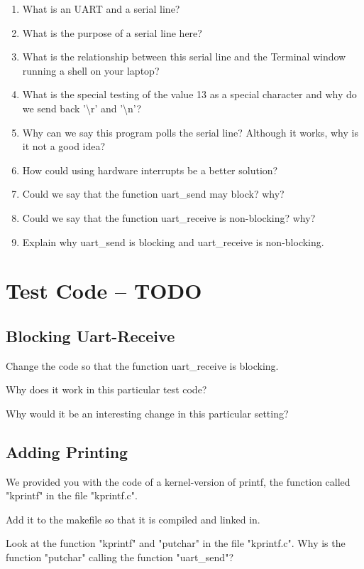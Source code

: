\documentclass[10]{article}
\begin{document}
\begin{enumerate}
\item
  What is an UART and a serial line? 
\item
  What is the purpose of a serial line here?
\item
  What is the relationship between this serial line
  and the Terminal window running a shell on your laptop?
\item
  What is the special testing of the value 13 as a special
  character and why do we send back '\textbackslash r' and '\textbackslash n'?
\item
  Why can we say this program polls the serial line?
  Although it works, why is it not a good idea?
\item
  How could using hardware interrupts be a better solution?
\item
  Could we say that the function uart\_send may block? why?
\item
  Could we say that the function uart\_receive is non-blocking? why?
\item
  Explain why uart\_send is blocking and uart\_receive is non-blocking.  
\end{enumerate}

\section{Test Code -- TODO}

\subsection{Blocking Uart-Receive}

Change the code so that the function uart\_receive is blocking.

Why does it work in this particular test code?

Why would it be an interesting change in this particular setting?

\subsection{Adding Printing}

We provided you with the code of a kernel-version of printf,
the function called "kprintf" in the file "kprintf.c".

Add it to the makefile so that it is compiled and linked in.

Look at the function "kprintf" and "putchar" in the file
"kprintf.c". Why is the function "putchar" calling the
function "uart\_send"?
\end{document}
